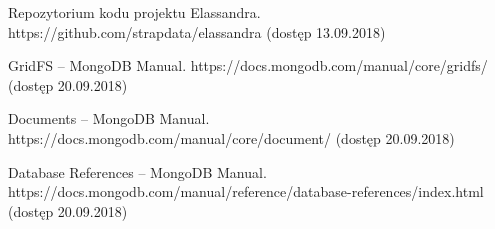 \begin{thebibliography}{54}
    
 Repozytorium kodu projektu Elassandra.
https://github.com/strapdata/elassandra (dostęp 13.09.2018)

 GridFS -- MongoDB Manual. https://docs.mongodb.com/manual/core/gridfs/ (dostęp 20.09.2018)

 Documents -- MongoDB Manual. https://docs.mongodb.com/manual/core/document/ (dostęp 20.09.2018)

 Database References -- MongoDB Manual. \\ 
https://docs.mongodb.com/manual/reference/database-references/index.html \\
(dostęp 20.09.2018)
    
\end{thebibliography}
